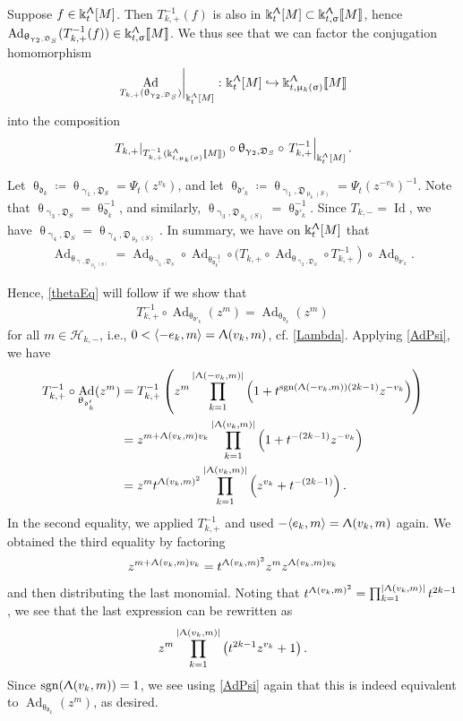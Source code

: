 \documentclass{amsart}
\DeclareMathOperator{\Id}{Id}
\DeclareMathOperator{\sign}{sgn}
\DeclareMathOperator{\Ad}{Ad}
\let\llb=\llbracket
\let\rrb=\rrbracket
\let\f=\mathfrak
\let\s=\mathcal
\newcommand {\kk} {\Bbbk}
\renewcommand{\theta}{\uptheta}
\renewcommand{\gamma}{\upgamma}
\renewcommand{\sigma}{\upsigma}
\renewcommand{\Lambda}{\Uplambda}
\renewcommand{\mu}{\upmu}
\theoremstyle{plain}%
\theoremstyle{definition}
\theoremstyle{remark}
\newenvironment{myproof}[1][\proofname]{\proof[#1]\mbox{}}{\endproof}
\begin{document}
\begin{myproof}[Proof of Proposition \ref{mut-inv}]
Suppose $f\in \kk_t^{\Lambda}[M]$.  Then $T_{k,+}^{-1}(f)$ is also in $\kk_t^{\Lambda}[M]\subset \kk_{t,\sigma}^{\Lambda}\llb M\rrb$, hence $\Ad_{\theta_{\gamma_2,\f{D}_S}}(T_{k,+}^{-1}(f))\in \kk_{t,\sigma}^{\Lambda}\llb M\rrb$.  We thus see that we can factor the conjugation homomorphism 
$$\left.{\Ad_{T_{k,+}(\theta_{\gamma_2,\f{D}_S})}}\right|_{\kk_t^{\Lambda}[M]}\colon \kk_t^{\Lambda}[M]\hookrightarrow \kk_{t,\mu_k(\sigma)}^{\Lambda}\llb M\rrb$$
into the composition $$\left.T_{k,+}\right|_{T_{k,+}^{-1}(\kk_{t,\mu_k(\sigma)}^{\Lambda}\llb M\rrb)}\circ {\theta_{\gamma_2,\f{D}_S}} \circ \left.T_{k,+}^{-1}\right|_{\kk_t^{\Lambda}[M]}.$$



Let $\theta_{\f{d}_k}\coloneqq \theta_{\gamma_1,\f{D}_S}=\Psi_t(z^{v_k})$, and let $\theta_{\f{d}'_k}\coloneqq  \theta_{\gamma_1,\f{D}_{\mu_k(S)}}=\Psi_t(z^{-v_k})^{-1}$.  Note that $\theta_{\gamma_3,\f{D}_S}=\theta_{\f{d}_k}^{-1}$, and similarly, $\theta_{\gamma_3,\f{D}_{\mu_k(S)}}=\theta_{\f{d}'_k}^{-1}$.  Since $T_{k,-}=\Id$, we have $\theta_{\gamma_4,\f{D}_{S}}=\theta_{\gamma_4,\f{D}_{\mu_k(S)}}$.  In summary, we have on $\kk_t^{\Lambda}[M]$ that
\begin{align*}
    \Ad_{\theta_{\gamma,\f{D}_{\mu_k(S)}}} =  \Ad_{\theta_{\gamma_4,\f{D}_{S}}}\circ \Ad_{\theta_{\f{d}_{k}'}^{-1}} \circ (T_{k,+}\circ \Ad_{\theta_{\gamma_2,\f{D}_S}} \circ \left.T_{k,+}^{-1}\right)\circ \Ad_{\theta_{\f{d}'_k}}.
\end{align*}

Hence, \eqref{thetaEq} will follow if we show that 
\begin{align*}
    T_{k,+}^{-1} \circ \Ad_{\theta_{\f{d}'_k}}(z^m) = \Ad_{\theta_{\f{d}_k}}(z^m)
\end{align*}
for all $m\in \s{H}_{k,-}$, i.e., $0<\langle -e_k,m\rangle = \Lambda(v_k,m)$, cf.  \eqref{Lambda}.   
Applying \eqref{AdPsi}, we have
\begin{align*}
    T_{k,+}^{-1} \circ \Ad_{\theta_{\f{d}'_k}}(z^m) &= T_{k,+}^{-1}\left(z^m \prod_{k=1}^{|\Lambda(-v_k,m)|} \left(1+t^{\sign(\Lambda(-v_k,m))(2k-1)}z^{-v_k}\right)\right) \\
    &= z^{m+\Lambda(v_k,m) v_k} \prod_{k=1}^{|\Lambda(v_k,m)|} \left(1+t^{-(2k-1)}z^{-v_k}\right) \\
     &= z^{m}t^{\Lambda(v_k,m)^2} \prod_{k=1}^{|\Lambda(v_k,m)|}  \left(z^{v_k}+t^{-(2k-1)}\right).  
\end{align*}
In the second equality, we applied $T_{k,+}^{-1}$ and used $-\langle e_k,m\rangle = \Lambda(v_k,m)$  again.   We obtained the third equality by factoring $$z^{m+\Lambda(v_k,m)v_k}=t^{\Lambda(v_k,m)^2} z^mz^{\Lambda(v_k,m)v_k}$$ and then distributing the last monomial.  Noting that $t^{\Lambda(v_k,m)^2}=\prod_{k=1}^{|\Lambda(v_k,m)|} t^{2k-1}$, we see that the last expression can be rewritten as
\begin{align}\label{thetadk}
     z^{m}\prod_{k=1}^{|\Lambda(v_k,m)|} \left(t^{2k-1}z^{v_k}+1\right).
\end{align}
Since $\sign(\Lambda(v_k,m))=1$, we see using \eqref{AdPsi} again that this is indeed equivalent to $\Ad_{\theta_{\f{d}_k}}(z^m)$, as desired.
\end{myproof}
\end{document}
